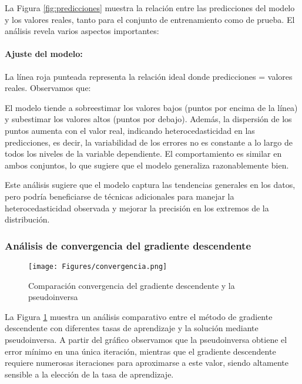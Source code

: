 \documentclass{tp02}
\begin{document}
La Figura \ref{fig:predicciones} muestra la relación entre las predicciones 
del modelo y los valores reales, tanto para el conjunto de entrenamiento 
como de prueba. El análisis revela varios aspectos importantes:

\paragraph{Ajuste del modelo:} La línea roja punteada representa la 
relación ideal donde predicciones = valores reales. Observamos que:

El modelo tiende a sobreestimar los valores bajos 
(puntos por encima de la línea) y subestimar los valores altos 
(puntos por debajo). Además, la dispersión de los puntos aumenta 
con el valor real, indicando heterocedasticidad en las predicciones, es decir, 
la variabilidad de los errores no es constante a lo largo de todos los
niveles de la variable dependiente. El comportamiento es similar 
en ambos conjuntos, lo que sugiere que el modelo generaliza razonablemente bien.

Este análisis sugiere que el modelo captura las tendencias generales 
en los datos, pero podría beneficiarse de técnicas 
adicionales para manejar la heterocedasticidad observada y mejorar la 
precisión en los extremos de la distribución.


\subsubsection{Análisis de convergencia del gradiente descendente}

\begin{figure}[H]
    \centering
    \texttt{[image: Figures/convergencia.png]}
    \caption{Comparación convergencia del gradiente descendente y la pseudoinversa}
    \label{fig:convergencia}
    \end{figure}


La Figura \ref{fig:convergencia} muestra un análisis comparativo entre el 
método de gradiente descendente con diferentes tasas de aprendizaje y la 
solución mediante pseudoinversa. A partir del gráfico observamos que la 
pseudoinversa obtiene el error mínimo en una única iteración, mientras 
que el gradiente descendente requiere numerosas iteraciones para 
aproximarse a este valor, siendo altamente sensible a la elección de la 
tasa de aprendizaje.
\end{document}
